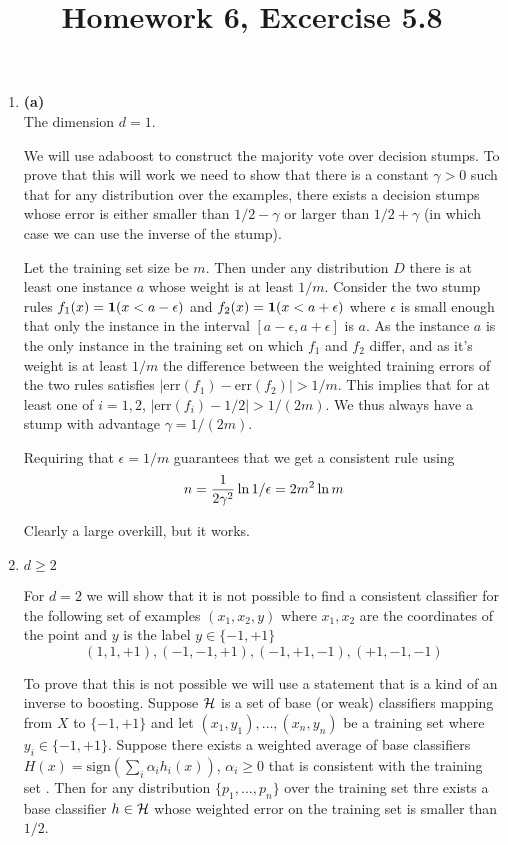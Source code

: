\documentclass[12pt]{article}
\title{Homework 6, Excercise 5.8}
\begin{document}
\maketitle
\begin{enumerate}

\item {\bf (a)}\\
The dimension $d=1$.

We will use adaboost to construct the majority vote over decision
stumps. To prove that this will work we need to show that there is a
constant $\gamma>0$ such that for any distribution over the examples,
there exists a decision stumps whose error is either smaller than
$1/2-\gamma$ or larger than $1/2+\gamma$ (in which case we can use the
inverse of the stump).

\newcommand{\err}{\mbox{err}}
Let the training set size be $m$. Then under any distribution $D$
there is at least one instance $a$ whose weight is at least
$1/m$. Consider the two stump rules $f_1(x) = {\bf 1}(x<a-\epsilon)$ and
$f_2(x) = {\bf 1}(x<a+\epsilon)$ where $\epsilon$ is small enough that
only the instance in the interval $[a-\epsilon,a+\epsilon]$ is $a$. As
the instance $a$ is the only instance in the training set on which
$f_1$ and $f_2$ differ, and as it's weight is at least $1/m$ the
difference between the weighted training errors of the two rules
satisfies $|\err(f_1)-\err(f_2)|>1/m$. This implies that for at least
one of $i=1,2$, $|\err(f_i)-1/2|>1/(2m)$. We thus always have a stump
with advantage $\gamma=1/(2m)$.

Requiring that $\epsilon=1/m$ guarantees that we get a consistent rule
using
\[
n={1 \over 2\gamma^2} \ln {1/\epsilon} = 2m^2 \ln m
\]

Clearly a large overkill, but it works.

\item {\bf${d \geq 2}$}

For $d=2$ we will show that it is not possible to find a consistent
classifier for the following set of examples $(x_1,x_2,y)$ where $x_1,x_2$ are
the coordinates of the point and $y$ is the label $y \in \{-1,+1\}$
\[
(1,1,+1),(-1,-1,+1),(-1,+1,-1),(+1,-1,-1)
\]

\newcommand{\sign}{\mbox{sign}}
To prove that this is not possible we will use a statement that is a
kind of an inverse to boosting.  Suppose ${\cal H}$ is a set of base
(or weak) classifiers mapping from $X$ to $\{-1,+1\}$ and let
$(x_1,y_1),\ldots,(x_n,y_n)$ be a training set where $y_i \in
\{-1,+1\}$. Suppose there exists a weighted average of base
classifiers $H(x) = \sign (\sum_i \alpha_i h_i(x))$, $\alpha_i \geq 0$ that is
consistent with the training set . Then for any distribution
$\{p_1,\ldots,p_n\}$ over the training set thre exists a base
classifier $h \in {\cal H}$ whose weighted error on the training set
is smaller than $1/2$.


\end{enumerate}
\end{document}

